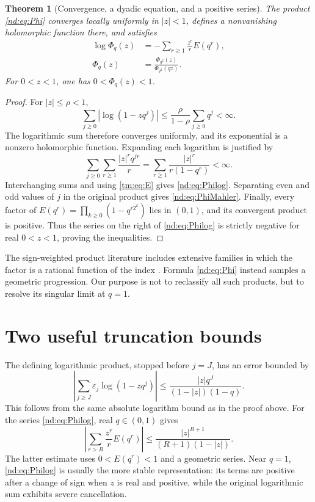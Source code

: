 \documentclass[11pt,a4paper,oneside,openany]{book}
\numberwithin{equation}{chapter}
\newtheorem{theorem}{Theorem}[chapter]
\theoremstyle{definition}
\theoremstyle{remark}
\newcommand{\eps}{\varepsilon}
\begin{document}
\begin{theorem}[Convergence, a dyadic equation, and a positive series]
\label{nd:thm:Phi}
The product \eqref{nd:eq:Phi} converges locally uniformly in \(|z|<1\), defines
a nonvanishing holomorphic function there, and satisfies
\begin{align}
 \log\Phi_q(z)&=-\sum_{r\ge1}\frac{z^r}{r}E(q^r),
 \label{nd:eq:Philog}\\
 \Phi_q(z)&=\frac{\Phi_{q^2}(z)}{\Phi_{q^2}(qz)}.
 \label{nd:eq:PhiMahler}
\end{align}
For \(0<z<1\), one has \(0<\Phi_q(z)<1\).
\end{theorem}
\begin{proof}
For \(|z|\le\rho<1\),
\[
 \sum_{j\ge0}|\log(1-zq^j)|
 \le\frac{\rho}{1-\rho}\sum_{j\ge0}q^j<\infty.
\]
The logarithmic sum therefore converges uniformly, and its exponential is a
nonzero holomorphic function. Expanding each logarithm is justified by
\[
 \sum_{j\ge0}\sum_{r\ge1}\frac{|z|^rq^{jr}}r
 =\sum_{r\ge1}\frac{|z|^r}{r(1-q^r)}<\infty.
\]
Interchanging sums and using \eqref{tm:eq:E} gives \eqref{nd:eq:Philog}.
Separating even and odd values of \(j\) in the original product gives
\eqref{nd:eq:PhiMahler}. Finally, every factor of
\(E(q^r)=\prod_{k\ge0}(1-q^{r2^k})\) lies in \((0,1)\), and its convergent
product is positive. Thus the series on the right of \eqref{nd:eq:Philog} is
strictly negative for real \(0<z<1\), proving the inequalities.
\end{proof}

The sign-weighted product literature includes extensive families in which the
factor is a rational function of the index \cite{ars,li}. Formula
\eqref{nd:eq:Phi} instead samples a geometric progression. Our purpose is not to
reclassify all such products, but to resolve its singular limit at \(q=1\).

\section{Two useful truncation bounds}
The defining logarithmic product, stopped before \(j=J\), has an error bounded
by
\begin{equation}
 \left|\sum_{j\ge J}\eps_j\log(1-zq^j)\right|
 \le\frac{|z|q^J}{(1-|z|)(1-q)}.
 \label{nd:eq:jtail}
\end{equation}
This follows from the same absolute logarithm bound as in the proof above.
For the series \eqref{nd:eq:Philog}, real \(q\in(0,1)\) gives
\begin{equation}
 \left|\sum_{r>R}\frac{z^r}{r}E(q^r)\right|
 \le\frac{|z|^{R+1}}{(R+1)(1-|z|)}.
 \label{nd:eq:rtail}
\end{equation}
The latter estimate uses \(0<E(q^r)<1\) and a geometric series. Near \(q=1\),
\eqref{nd:eq:Philog} is usually the more stable representation: its terms are
positive after a change of sign when \(z\) is real and positive, while the
original logarithmic sum exhibits severe cancellation.
\end{document}
